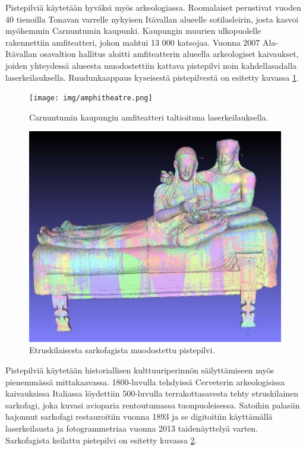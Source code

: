 Pistepilviä käytetään hyväksi myös arkeologiassa. Roomalaiset perustivat vuoden 40 tienoilla Tonavan varrelle nykyisen Itävallan alueelle
sotilasleirin, josta kasvoi myöhemmin Carnuntumin kaupunki. Kaupungin muurien ulkopuolelle rakennettiin amfiteatteri, johon mahtui 13 000 katsojaa.
Vuonna 2007 Ala-Itävallan osavaltion hallitus aloitti amfiteatterin alueella arkeologiset kaivaukset, joiden yhteydessä alueesta muodostettiin kattava pistepilvi noin kahdellasadalla laserkeilauksella. Ruudunkaappaus kyseisestä pistepilvestä on esitetty kuvassa \ref{amfi}. \cite{Carnuntum}

\begin{figure}
    \centering
    \texttt{[image: img/amphitheatre.png]}
    \caption{Carnuntumin kaupungin amfiteatteri taltioituna laserkeilauksella. \cite{Amphitheatre}}
    \label{amfi}
\end{figure}

\begin{figure}
    \centering
    \includegraphics[width=0.4\paperwidth]{img/sarkofagi.png}
    \caption{Etruskilaisesta sarkofagista muodostettu pistepilvi. \cite{sarkofagi}}
    \label{sarko}
\end{figure}

Pistepilviä käytetään historiallisen kulttuuriperinnön säilyttämiseen myös pienemmässä mittakaavassa. 1800-luvulla tehdyissä Cerveterin arkeologisissa kaivauksissa Italiassa löydettiin 500-luvulla terrakottasavesta tehty etruskilainen sarkofagi, joka kuvasi avioparia rentoutumassa tuonpuoleisessa. Satoihin palasiin hajonnut sarkofagi restauroitiin vuonna 1893 ja se digitoitiin käyttämällä laserkeilausta ja fotogrammetriaa vuonna 2013 taidenäyttelyä varten. Sarkofagista keilattu pistepilvi on esitetty kuvassa \ref{sarko}. \cite{sarkofagi} 

